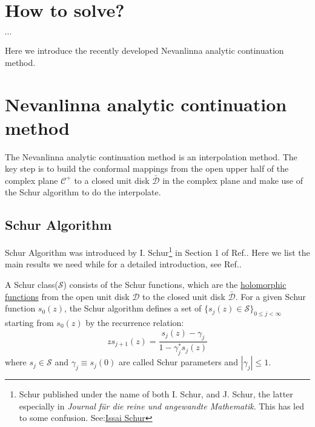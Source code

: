 \documentclass[
	preprint,%
	aps,
	prb,
	showpacs,	
	amsmath, amssymb]{revtex4-2}
\DeclareRobustCommand{\+}{\hstretch{1.25} {\boldsymbol {\mathrel{+}}}}
\newcommand{\C}{ {\mathcal{C}} }
\newcommand{\D}{ {\mathcal{D}} }
\newcommand{\Dbar}{ {\bar{\mathcal{D}}} }
\begin{document}
\section{How to solve?}
\label{sec:how-to-solve}

$\cdots$

Here we introduce the recently developed Nevanlinna 
analytic continuation method\cite{fei2021nevanlinna}.      
\section{Nevanlinna analytic continuation method}
\label{sec:nevanlinna-analytical-continuation-method}

The Nevanlinna analytic continuation method\cite{fei2021nevanlinna} 
is an interpolation method. The key step is to build the conformal mappings 
from the open upper half of the complex plane $\C^+$ 
to a closed unit disk $\Dbar$ in the complex plane and 
make use of the Schur algorithm
\cite{schur1917potenzreihen,schur1918potenzreihen,dym2003contributions} 
to do the interpolate.

\subsection{Schur Algorithm}
\label{subsec:schur-algorithm}

Schur Algorithm was introduced by I. Schur\footnote{Schur 
	published under the name of both I. Schur, 
	and J. Schur, the latter especially in  
	\textit{Journal für die reine 
	und angewandte Mathematik}. This has led to some confusion.
	See:\href{https://en.wikipedia.org/wiki/Issai_Schur#cite_note-2}{Issai Schur}} 
in Section 1 of Ref.\cite{schur1917potenzreihen}.
Here we list the main results we need while
for a detailed introduction, see Ref.\cite{dym2003contributions}. 

A Schur class($\mathcal{S}$) consists of the Schur functions, which are the 
\href{https://en.wikipedia.org/wiki/Holomorphic_function}{holomorphic functions} 
from the open unit disk $\D$ to 
the closed unit disk $\Dbar$. 
For a given Schur function $s_0(z)$, the Schur algorithm defines a set of
$\{s_j(z) \in \mathcal{S}\}_{0\leq j <\infty}$ starting from $s_0(z)$ by the recurrence relation:
\begin{equation}\label{eq:schur-function-recursion}
	zs_{j+1}(z) = \frac{s_j(z) - \gamma_j}{1 - \gamma_j^* s_j(z)}
\end{equation}
where $s_j \in \mathcal{S}$ and $\gamma_j \equiv s_j(0)$ are called Schur 
parameters and $|\gamma_j| \leq 1$. 
\end{document}
